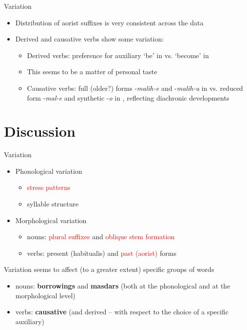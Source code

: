 \begin{frame}{Variation}
\begin{itemize}
    \item Distribution of aorist suffixes is very consistent across the data
    \item Derived and causative verbs show some variation:
    \begin{itemize}
        \item Derived verbs: preference for auxiliary `be' in \citet{saidovaabusov2012} vs. `become' in \citet{alekseev2019} 
        \item This seems to be a matter of personal taste
        \item Causative verbs: full (older?) forms -\textit{malih-e} and -\textit{malih-u} in \citet{alekseev2019} vs. reduced form -\textit{mal-e} and synthetic -\textit{o} in \citet{saidovaabusov2012}, reflecting diachronic developments
    \end{itemize}
\end{itemize}
\end{frame}

\section{Discussion}
\begin{frame}{Variation}
\begin{itemize}
    \item Phonological variation
    \begin{itemize}
        \item \textcolor{red}{stress patterns}
        \item syllable structure
    \end{itemize}
    \item Morphological variation
    \begin{itemize}
        \item nouns: \textcolor{red}{plural suffixes} and \textcolor{red}{oblique stem formation}
        \item verbs: present (habitualis) and \textcolor{red}{past (aorist)} forms 
    \end{itemize}
\end{itemize}
Variation seems to affect (to a greater extent) specific groups of words
\begin{itemize}
    \item nouns: \textbf{borrowings} and \textbf{masdars} (both at the phonological and at the morphological level)
    \item verbs: \textbf{causative} (and derived -- with respect to the choice of a specific auxiliary)
\end{itemize}
\end{frame}

